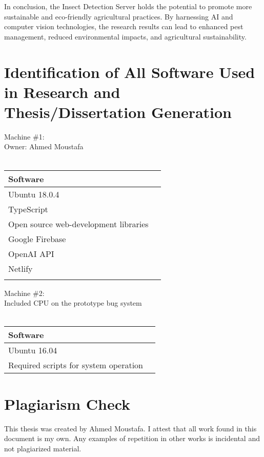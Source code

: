 In conclusion, the Insect Detection Server holds the potential to promote more sustainable and eco-friendly agricultural practices. By harnessing AI and computer vision technologies, the research results can lead to enhanced pest management, reduced environmental impacts, and agricultural sustainability.

\chapter{Identification of All Software Used in Research and Thesis/Dissertation Generation}

Machine \#1:\\
Owner: Ahmed Moustafa\\\\
\begin{tabular}{ll}
Software\\
\hline
Ubuntu 18.0.4 \\
TypeScript \\
Open source web-development libraries \\
Google Firebase \\
OpenAI API \\
Netlify \\\\
\end{tabular}

Machine \#2:\\
Included CPU on the prototype bug system \\\\
\begin{tabular}{ll}
Software\\ 
\hline
Ubuntu 16.04 \\
Required scripts for system operation \\
\end{tabular}



\chapter{Plagiarism Check}
This thesis was created by Ahmed Moustafa. I attest that all work found in this document is my own. Any examples of repetition in other works is incidental and not plagiarized material.
\vspace{1in}
\makebox[1.5in]{\hrulefill}\\
